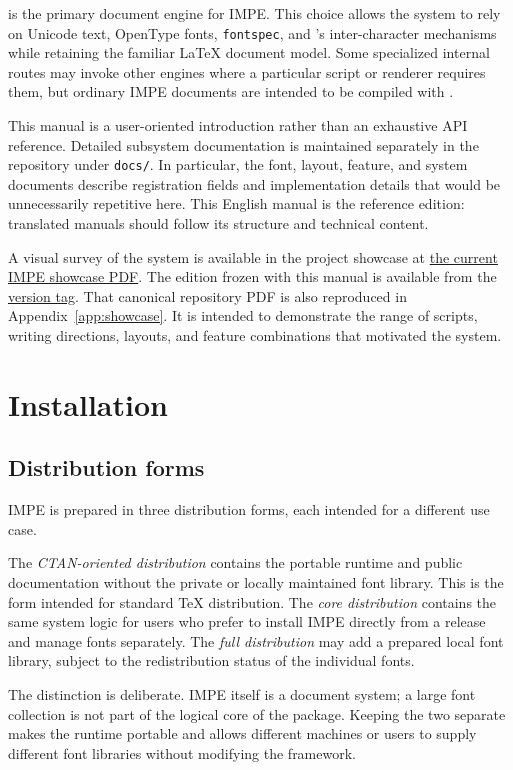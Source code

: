 \documentclass[11pt]{impeart}
\newcommand{\IMPEShowcaseURL}{https://github.com/KelvinYangBK67/IMPE-LaTeX-System/blob/main/_showcase/main.pdf}
\newcommand{\IMPETaggedShowcaseURL}{https://github.com/KelvinYangBK67/IMPE-LaTeX-System/blob/v\IMPEVersion/_showcase/main.pdf}
\begin{document}
\XeLaTeX{} is the primary document engine for IMPE.  This choice allows the system
to rely on Unicode text, OpenType fonts, \texttt{fontspec}, and \XeTeX{}'s
inter-character mechanisms while retaining the familiar \LaTeX{} document model.
Some specialized internal routes may invoke other engines where a particular
script or renderer requires them, but ordinary IMPE documents are intended to
be compiled with \XeLaTeX{}.

This manual is a user-oriented introduction rather than an exhaustive API
reference.  Detailed subsystem documentation is maintained separately in the
repository under \texttt{docs/}.  In particular, the font, layout, feature, and
system documents describe registration fields and implementation details that
would be unnecessarily repetitive here.  This English manual is the reference
edition: translated manuals should follow its structure and technical content.

A visual survey of the system is available in the project showcase at
\href{\IMPEShowcaseURL}{the current IMPE showcase PDF}.  The edition frozen
with this manual is available from the
\href{\IMPETaggedShowcaseURL}{version tag}.  That canonical repository PDF is
also reproduced in Appendix~\ref{app:showcase}.  It is intended to demonstrate
the range of scripts, writing directions, layouts, and feature combinations
that motivated the system.

\section{Installation}

\subsection{Distribution forms}

IMPE is prepared in three distribution forms, each intended for a different
use case.

The \emph{CTAN-oriented distribution} contains the portable runtime and public
documentation without the private or locally maintained font library.  This is
the form intended for standard \TeX{} distribution.  The \emph{core distribution}
contains the same system logic for users who prefer to install IMPE directly
from a release and manage fonts separately.  The \emph{full distribution} may
add a prepared local font library, subject to the redistribution status of the
individual fonts.

The distinction is deliberate.  IMPE itself is a document system; a large font
collection is not part of the logical core of the package.  Keeping the two
separate makes the runtime portable and allows different machines or users to
supply different font libraries without modifying the framework.
\end{document}
